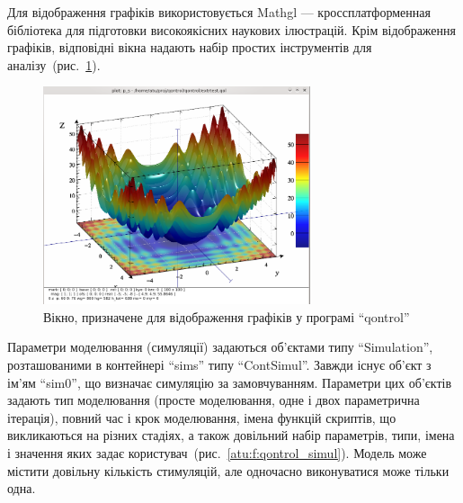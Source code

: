 Для відображення графіків використовується Mathgl ---
кроссплатформенная бібліотека для підготовки високоякісних
наукових ілюстрацій. Крім відображення графіків,
відповідні вікна надають набір простих інструментів для
аналізу~(рис.~\ref{atu:f:qontrol_3d}).


\begin{figure}[htb!]
  \begin{center}
    \includegraphics[width=0.7\textwidth]{p/qontrol_3d_a.png}
  \end{center}
\caption{Вікно, призначене для відображення графіків у програмі ``qontrol''}
  \label{atu:f:qontrol_3d}
\end{figure}

Параметри моделювання (симуляції) задаються об'єктами
типу ``Simulation'', розташованими в контейнері ``sims'' типу ``ContSimul''.
Завжди існує об'єкт з ім'ям ``sim0'', що визначає симуляцію за
замовчуванням. Параметри цих об'єктів задають тип моделювання
(просте моделювання, одне і двох параметрична ітерація), повний
час і крок моделювання, імена функцій скриптів, що викликаються на
різних стадіях, а також довільний набір параметрів, типи, імена
і значення яких задає користувач~(рис.~\ref{atu:f:qontrol_simul}). Модель
може містити довільну кількість стимуляцій, але одночасно
виконуватися може тільки одна.

